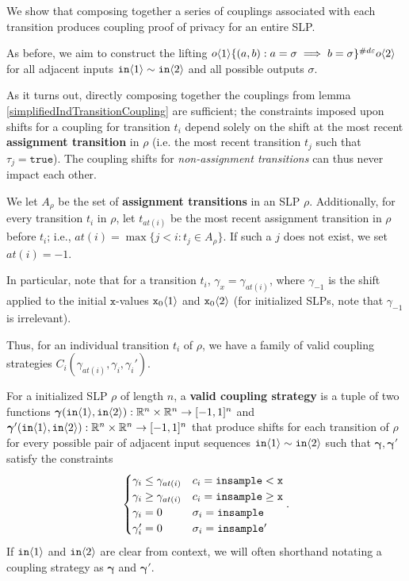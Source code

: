 We show that composing together a series of couplings associated with each transition produces coupling proof of privacy for an entire SLP. 

As before, we aim to construct the lifting $o\brangle{1}\{(a, b): a=\sigma\implies b=\sigma\}^{\#d\varepsilon}o\brangle{2}$ for all adjacent inputs $\texttt{in}\brangle{1}\sim\texttt{in}\brangle{2}$ and all possible outputs $\sigma$.

As it turns out, directly composing together the couplings from lemma \ref{simplifiedIndTransitionCoupling} are sufficient; the constraints imposed upon shifts for a coupling for transition $t_i$ depend solely on the shift at the most recent \textbf{assignment transition} in $\rho$ (i.e. the most recent transition $t_j$ such that $\tau_j = \texttt{true}$). 
The coupling shifts for \textit{non-assignment transitions} can thus never impact each other. 

We let $A_\rho$ be the set of \textbf{assignment transitions} in an SLP $\rho$. Additionally, for every transition $t_i$ in $\rho$, let $t_{at(i)}$ be the most recent assignment transition in $\rho$ before $t_i$; i.e., $at(i) = \max\{j<i: t_j\in A_\rho\}$. If such a $j$ does not exist, we set $at(i)=-1$. 

In particular, note that for a transition $t_i$, $\gamma_x = \gamma_{at(i)}$, where $\gamma_{-1}$ is the shift applied to the initial $\texttt{x}$-values $\texttt{x}_0\brangle{1}$ and $\texttt{x}_0\brangle{2}$ (for initialized SLPs, note that $\gamma_{-1}$ is irrelevant).

Thus, for an individual transition $t_i$ of $\rho$, we have a family of valid coupling strategies $C_i(\gamma_{at(i)}, \gamma_i, \gamma_i')$. 

\begin{defn}
  For a initialized SLP $\rho$ of length $n$, a \textbf{valid coupling strategy} is a tuple of two functions $\bm{\gamma}(\texttt{in}\brangle{1}, \texttt{in}\brangle{2}):\RR^n\times \RR^n\to [-1, 1]^n$ and $\bm{\gamma}'(\texttt{in}\brangle{1}, \texttt{in}\brangle{2}):\RR^n\times \RR^n\to [-1, 1]^n$ 
  that produce shifts for each transition of $\rho$ for every possible pair of adjacent input sequences $\texttt{in}\brangle{1}\sim\texttt{in}\brangle{2}$ such that $\bm{\gamma}, \bm{\gamma'}$ satisfy the constraints \[
    \begin{cases}
      \gamma_i\leq\gamma_{at(i)} & c_i = \lguard[\texttt{x}]\\
      \gamma_i\geq\gamma_{at(i)} & c_i = \gguard[\texttt{x}]\\
      \gamma_i=0 & \sigma_i = \texttt{insample}\\
      \gamma_i'=0 & \sigma_i = \texttt{insample}'
    \end{cases}.
  \]
  If $\texttt{in}\brangle{1}$ and $\texttt{in}\brangle{2}$ are clear from context, we will often shorthand notating a coupling strategy as $\bm{\gamma}$ and $\bm{\gamma}'$. 
\end{defn}


